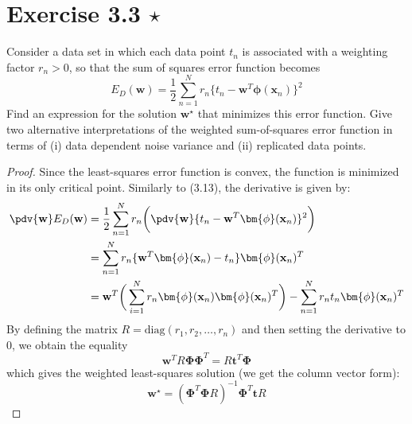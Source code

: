 \section*{Exercise 3.3 $\star$}
Consider a data set in which each data point $t_n$ is associated with a weighting
factor $r_n > 0$, so that the sum of squares error function becomes
\begin{equation}\label{eq:3.104}\tag{3.104}
    E_D(\mathbf{w}) = \frac{1}{2} \sum_{n=1}^{N} 
    r_n\{t_n - \mathbf{w}^T \bm{\phi}(\mathbf{x}_n)\}^2
\end{equation}
Find an expression for the solution $\mathbf{w}^\star$ that minimizes this error function.
Give two alternative interpretations of the weighted sum-of-squares error function
in terms of (i) data dependent noise variance and (ii) replicated data points.

\vspace{1em}

\begin{proof}
    Since the least-squares error function is convex,
    the function is minimized in its only critical 
    point. Similarly to (3.13), the derivative is given by:
    \begin{align*}
        \pdv{\mathbf{w}} E_D(\mathbf{w})
        &= \frac{1}{2} \sum_{n=1}^{N} r_n \bigg(\pdv{\mathbf{w}} 
        \{t_n - \mathbf{w}^T \bm{\phi}(\mathbf{x}_n)\}^2\bigg) \\
        &= \sum_{n=1}^N r_n \{\mathbf{w}^T \bm{\phi}(\mathbf{x}_n) - t_n\} 
        \bm{\phi}(\mathbf{x}_n)^T \\
        &= \mathbf{w}^T 
        \bigg(\sum_{i=1}^{N} r_n \bm{\phi}(\mathbf{x}_n)
        \bm{\phi}(\mathbf{x}_n)^T\bigg) -
        \sum_{n=1}^{N} r_n t_n \bm{\phi}(\mathbf{x}_n)^T
    \end{align*}
    By defining the matrix $R = \text{diag}(r_1, r_2, \ldots, r_n)$
    and then setting the derivative to 0, we obtain the equality
    \[
        \mathbf{w}^T R\mathbf{\Phi}\mathbf{\Phi}^T
        = R\mathbf{t}^T\mathbf{\Phi}
    \] 
    which gives the weighted least-squares solution (we get the
    column vector form):
    \[
        \mathbf{w}^\star = (\mathbf{\Phi}^T\mathbf{\Phi}R)^{-1} \mathbf{\Phi}^T \mathbf{t} R 
    \] 
\end{proof}
